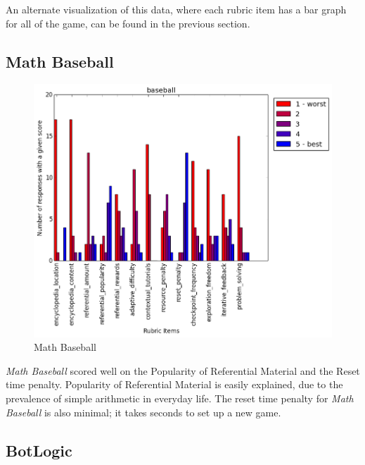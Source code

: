 			An alternate visualization of this data, where each rubric item has a bar graph for all of the game, can be found in the previous section.

			\subsection{Math Baseball}

				\begin{figure}[] 
				\centering 
				\includegraphics[width=\textwidth, height=.4\textheight, keepaspectratio=true]{baseball_scores.png} 
				\caption{Math Baseball}
				\end{figure}

				\textit{Math Baseball} scored well on the Popularity of Referential Material and the Reset time penalty. Popularity of Referential Material is easily explained, due to the prevalence of simple arithmetic in everyday life. The reset time penalty for \textit{Math Baseball} is also minimal; it takes seconds to set up a new game.

			\subsection{BotLogic}


